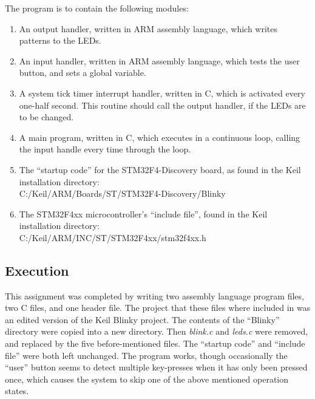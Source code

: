 \documentclass{article}
\begin{document}
The program is to contain the following modules:
\begin{enumerate}
	\item  An output handler, written in ARM assembly language, which writes patterns to the
       LEDs.
	\item  An input handler, written in ARM assembly language, which tests the user button, and
       sets a global variable.
	\item  A system tick timer interrupt handler, written in C, which is activated every one-half
       second. This routine should call the output handler, if the LEDs are to be changed.
	\item A main program, written in C, which executes in a continuous loop, calling the input
       handle every time through the loop.
   	\item The ``startup code'' for the STM32F4-Discovery board, as found in the Keil installation
       directory: \\ C:/Keil/ARM/Boards/ST/STM32F4-Discovery/Blinky
	\item The STM32F4xx microcontroller's ``include file'', found in the Keil installation directory:\\
       C:/Keil/ARM/INC/ST/STM32F4xx/stm32f4xx.h
\end{enumerate}

\subsection*{Execution}
This assignment was completed by writing two assembly language program files, two C files, and one header file. The project that these files where included in was an edited version of the Keil Blinky project. The contents of the ``Blinky'' directory were copied into a new directory. Then \emph{blink.c} and \emph{leds.c} were removed, and replaced by the five before-mentioned files. The ``startup code''  and ``include file'' were both left unchanged. The program works, though occasionally the ``user'' button seems to detect multiple key-presses when it has only been pressed once, which causes the system to skip one of the above mentioned operation states. 

\newpage









\label{end}
\end{document}
